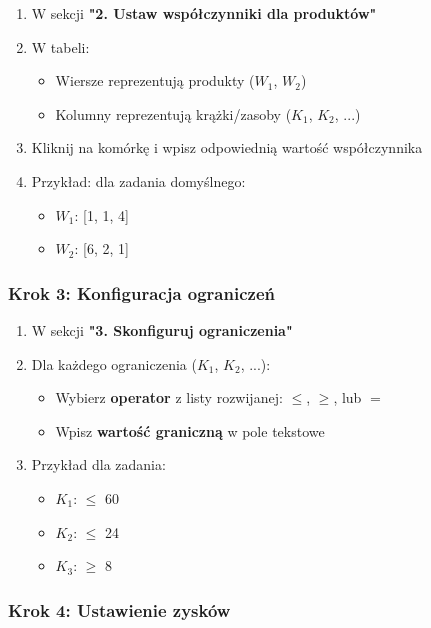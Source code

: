 \documentclass[12pt,a4paper]{article}
\begin{document}
\begin{enumerate}
    \item W sekcji \textbf{"2. Ustaw współczynniki dla produktów"}
    \item W tabeli:
    \begin{itemize}
        \item Wiersze reprezentują produkty ($W_1$, $W_2$)
        \item Kolumny reprezentują krążki/zasoby ($K_1$, $K_2$, ...)
    \end{itemize}
    \item Kliknij na komórkę i wpisz odpowiednią wartość współczynnika
    \item Przykład: dla zadania domyślnego:
    \begin{itemize}
        \item $W_1$: [1, 1, 4]
        \item $W_2$: [6, 2, 1]
    \end{itemize}
\end{enumerate}

\subsubsection{Krok 3: Konfiguracja ograniczeń}

\begin{enumerate}
    \item W sekcji \textbf{"3. Skonfiguruj ograniczenia"}
    \item Dla każdego ograniczenia ($K_1$, $K_2$, ...):
    \begin{itemize}
        \item Wybierz \textbf{operator} z listy rozwijanej: $\leq$, $\geq$, lub $=$
        \item Wpisz \textbf{wartość graniczną} w pole tekstowe
    \end{itemize}
    \item Przykład dla zadania:
    \begin{itemize}
        \item $K_1$: $\leq$ 60
        \item $K_2$: $\leq$ 24
        \item $K_3$: $\geq$ 8
    \end{itemize}
\end{enumerate}

\subsubsection{Krok 4: Ustawienie zysków}
\end{document}
